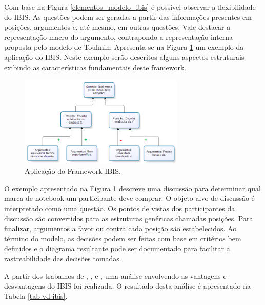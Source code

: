 Com base na Figura \ref{elementos_modelo_ibis}  é possível observar a flexibilidade do IBIS. As questões podem ser geradas a partir das informações presentes em posições, argumentos e, até mesmo, em outras questões. Vale destacar a representação macro do argumento, contrapondo a representação interna proposta pelo modelo de Toulmin. Apresenta-se na Figura \ref{aplicacao_modelo_ibis}  um exemplo da aplicação do IBIS. Neste exemplo serão descritos alguns aspectos estruturais exibindo as características fundamentais deste framework.

\graphicspath{{figuras/}}
\begin{figure}[H]
\centering
\includegraphics[width=0.7\textwidth]{aplicacao_modelo_ibis}
\caption{Aplicação do Framework IBIS.} 
\label{aplicacao_modelo_ibis}
\end{figure}

O exemplo apresentado na Figura \ref{aplicacao_modelo_ibis} descreve uma discussão para determinar qual marca de notebook um participante deve comprar. O objeto alvo de discussão é interpretado como uma questão. Os pontos de vistas dos participantes da discussão são convertidos para as estruturas genéricas chamadas posições. Para finalizar, argumentos a favor ou contra cada posição são estabelecidos. Ao término do modelo, as decisões podem ser feitas com base em critérios bem definidos e o diagrama resultante pode ser documentado para facilitar a rastreabilidade das decisões tomadas.

A partir dos trabalhos de , ,  e , uma análise envolvendo as vantagens e desvantagens do IBIS foi realizada. O resultado desta análise é apresentado na Tabela \ref{tab-vd-ibis}. 

